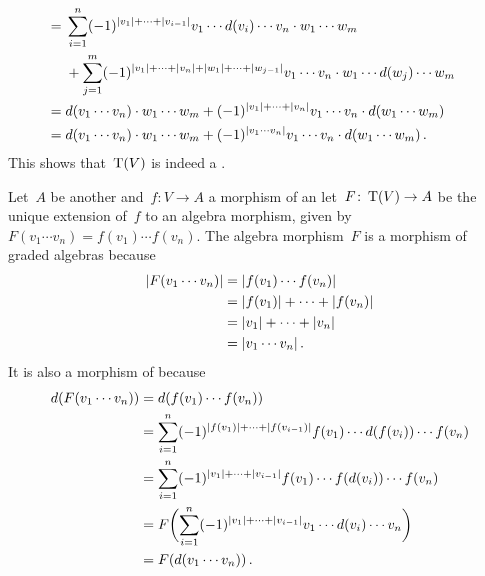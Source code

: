 \begin{enumerate}[start=2]
\begin{gather*}
\begin{aligned}
        \\
        ={}&
        \sum_{i=1}^n
        (-1)^{\lvert v_1\rvert + \dotsb + \lvert v_{i-1}\rvert}
        v_1 \dotsm d(v_i) \dotsm v_n \cdot w_1 \dotsm w_m
        \\
        {}&
        +
        \sum_{j=1}^m
        (-1)^{\lvert v_1\rvert + \dotsb + \lvert v_n\rvert + \lvert w_1\rvert + \dotsb + \lvert w_{j-1}\rvert}
        v_1 \dotsm v_n \cdot w_1 \dotsm d(w_j) \dotsm w_m
        \\
        ={}&
        d(v_1 \dotsm v_n) \cdot w_1 \dotsm w_m
        +
        (-1)^{\lvert v_1\rvert + \dotsb + \lvert v_n\rvert}
        v_1 \dotsm v_n \cdot d(w_1 \dotsm w_m)
        \\
        ={}&
        d(v_1 \dotsm v_n) \cdot w_1 \dotsm w_m
        +
        (-1)^{\lvert v_1 \dotsm v_n\rvert}
        v_1 \dotsm v_n \cdot d(w_1 \dotsm w_m) \,.
      \end{aligned}
    \end{gather*}
    This shows that~$\operatorname{T}(V)$ is indeed a {\dga}.
    
    Let~$A$ be another {\dga} and~$f \colon V \to A$ a morphism of {\dgvs} an let~$F \colon \operatorname{T}(V) \to A$ be the unique extension of~$f$ to an algebra morphism, given by~$F(v_1 \dotsm v_n) = f(v_1) \dotsm f(v_n)$.
    The algebra morphism~$F$ is a morphism of graded algebras because
    \begin{align*}
      \lvert F(v_1 \dotsm v_n)\rvert
      &=
      \lvert f(v_1) \dotsm f(v_n)\rvert
      \\
      &=
      \lvert f(v_1)\rvert + \dotsb + \lvert f(v_n)\rvert
      \\
      &=
      \lvert v_1\rvert + \dotsb + \lvert v_n\rvert
      \\
      &=
      \lvert v_1 \dotsm v_n\rvert \,.
    \end{align*}
    It is also a morphism of {\dgvs} because
    \begin{align*}
      d(F(v_1 \dotsm v_n))
      &=
      d( f(v_1) \dotsm f(v_n) )
      \\
      &=
      \sum_{i=1}^n
      (-1)^{\lvert f(v_1)\rvert + \dotsb + \lvert f(v_{i-1})\rvert }
      f(v_1) \dotsm d(f(v_i)) \dotsm f(v_n)
      \\
      &=
      \sum_{i=1}^n
      (-1)^{\lvert v_1\rvert + \dotsb + \lvert v_{i-1}\rvert }
      f(v_1) \dotsm f(d(v_i)) \dotsm f(v_n)
      \\
      &=
      F\biggl(
        \sum_{i=1}^n
        (-1)^{\lvert v_1\rvert + \dotsb + \lvert v_{i-1}\rvert }
        v_1 \dotsm d(v_i) \dotsm v_n
      \biggr)
      \\
      &=
      F(d(v_1 \dotsm v_n)) \,.
    \end{align*}

\end{enumerate}





